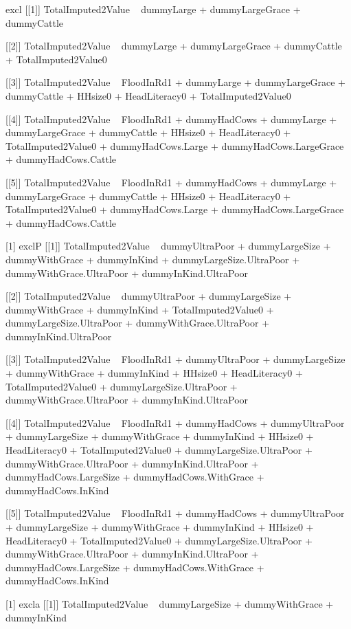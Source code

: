 \begin{Schunk}
\begin{Soutput}
[1] excl
[[1]]
TotalImputed2Value ~ dummyLarge + dummyLargeGrace + dummyCattle

[[2]]
TotalImputed2Value ~ dummyLarge + dummyLargeGrace + dummyCattle + 
    TotalImputed2Value0

[[3]]
TotalImputed2Value ~ FloodInRd1 + dummyLarge + dummyLargeGrace + 
    dummyCattle + HHsize0 + HeadLiteracy0 + TotalImputed2Value0

[[4]]
TotalImputed2Value ~ FloodInRd1 + dummyHadCows + dummyLarge + 
    dummyLargeGrace + dummyCattle + HHsize0 + HeadLiteracy0 + 
    TotalImputed2Value0 + dummyHadCows.Large + dummyHadCows.LargeGrace + 
    dummyHadCows.Cattle

[[5]]
TotalImputed2Value ~ FloodInRd1 + dummyHadCows + dummyLarge + 
    dummyLargeGrace + dummyCattle + HHsize0 + HeadLiteracy0 + 
    TotalImputed2Value0 + dummyHadCows.Large + dummyHadCows.LargeGrace + 
    dummyHadCows.Cattle

[1] exclP
[[1]]
TotalImputed2Value ~ dummyUltraPoor + dummyLargeSize + dummyWithGrace + 
    dummyInKind + dummyLargeSize.UltraPoor + dummyWithGrace.UltraPoor + 
    dummyInKind.UltraPoor

[[2]]
TotalImputed2Value ~ dummyUltraPoor + dummyLargeSize + dummyWithGrace + 
    dummyInKind + TotalImputed2Value0 + dummyLargeSize.UltraPoor + 
    dummyWithGrace.UltraPoor + dummyInKind.UltraPoor

[[3]]
TotalImputed2Value ~ FloodInRd1 + dummyUltraPoor + dummyLargeSize + 
    dummyWithGrace + dummyInKind + HHsize0 + HeadLiteracy0 + 
    TotalImputed2Value0 + dummyLargeSize.UltraPoor + dummyWithGrace.UltraPoor + 
    dummyInKind.UltraPoor

[[4]]
TotalImputed2Value ~ FloodInRd1 + dummyHadCows + dummyUltraPoor + 
    dummyLargeSize + dummyWithGrace + dummyInKind + HHsize0 + 
    HeadLiteracy0 + TotalImputed2Value0 + dummyLargeSize.UltraPoor + 
    dummyWithGrace.UltraPoor + dummyInKind.UltraPoor + dummyHadCows.LargeSize + 
    dummyHadCows.WithGrace + dummyHadCows.InKind

[[5]]
TotalImputed2Value ~ FloodInRd1 + dummyHadCows + dummyUltraPoor + 
    dummyLargeSize + dummyWithGrace + dummyInKind + HHsize0 + 
    HeadLiteracy0 + TotalImputed2Value0 + dummyLargeSize.UltraPoor + 
    dummyWithGrace.UltraPoor + dummyInKind.UltraPoor + dummyHadCows.LargeSize + 
    dummyHadCows.WithGrace + dummyHadCows.InKind

[1] excla
[[1]]
TotalImputed2Value ~ dummyLargeSize + dummyWithGrace + dummyInKind


\end{Soutput}
\end{Schunk}
